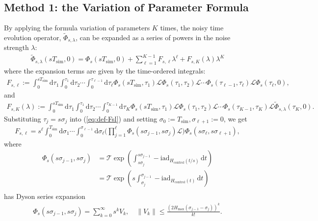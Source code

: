 \documentclass[11pt]{article}
\newcommand{\eq}[1]{(\ref{eq:#1})}
\renewcommand{\i}{\mathrm{i}}
\renewcommand{\d}{\mathrm{d}}
\renewcommand{\L}{\mathcal{L}}
\newcommand{\ad}{\mathrm{ad}}
\newcommand{\T}{\mathcal{T}}
\newcommand{\B}{\Big}
\newcommand{\simu}{\mathrm{sim}}
\newcommand{\Hc}{H_{\mathrm{control}}}
\begin{document}
\subsection{Method 1: the Variation of Parameter Formula}
By applying the formula variation of parameters $K$ times, the noisy time evolution operator, $\tilde{\Phi}_{s,\lambda}$, can be expanded as a series of powers in the noise strength $\lambda$:
\begin{align}
\label{eq:expansion-s-l}
    \tilde{\Phi}_{s,\lambda}(s T_{\simu}, 0) = \Phi_s(s T_{\simu}, 0) + \sum_{\ell=1}^{K-1}F_{s,\ell}\lambda^{\ell} + F_{s,K}(\lambda)\lambda^K 
\end{align}
where the expansion terms are given by the time-ordered integrals:
\begin{align}
    \label{eq:def-Fsl}
    F_{s,\ell} := \int_{0}^{s T_{\simu}} \d \tau_1 \int_{0}^{\tau_1}\d \tau_2 \cdots \int_{0}^{\tau_{\ell-1}} \d \tau_{\ell} \Phi_s(s T_{\simu}, \tau_1) \L \Phi_s(\tau_1, \tau_2) \L \cdots \Phi_s(\tau_{\ell-1}, \tau_{\ell}) \L\Phi_s(\tau_{\ell},0),
\end{align}
and
\begin{align*}
    F_{s, K}(\lambda) := \int_{0}^{s T_{\simu}} \d \tau_1 \int_{0}^{\tau_1}\d \tau_2 \cdots \int_{0}^{\tau_{K-1}} \d \tau_{K} \Phi_s(s T_{\simu}, \tau_1) \L \Phi_s(\tau_1, \tau_2) \L \cdots \Phi_s(\tau_{K-1}, \tau_{K}) \L\tilde{\Phi}_{s,\lambda}(\tau_{K},0).
\end{align*}
Substituting $\tau_j=s\sigma_j$ into \eq{def-Fsl} and setting $\sigma_{0}:=T_{\simu}, \sigma_{\ell+1}:=0$, we get \begin{align}
\label{eq:Fsl}
    F_{s,\ell}=s^\ell \int_{0}^{T_{\simu}} \d\sigma_1 \cdots \int_{0}^{\sigma_{\ell-1}} \d\sigma_{\ell} \B( \prod_{j=1}^{\ell} \Phi_s(s\sigma_{j-1}, s\sigma_j) \L \B) \Phi_s(s\sigma_\ell, s\sigma_{\ell+1}) ,
\end{align}
where \begin{align*}
    \Phi_s(s\sigma_{j-1}, s\sigma_j) &=\T \exp(\int_{s\sigma_j}^{s\sigma_{j-1}} -\i\ad_{\Hc(t/s)}\,\d t) \\
    &= \T \exp(s\int_{\sigma_j}^{\sigma_{j-1}} -\i\ad_{\Hc(t)}\,\d t) \\
\end{align*}
has Dyson series expansion \begin{align}
\label{eq:dyson-Phi}
    \Phi_s(s\sigma_{j-1}, s\sigma_j)=\sum_{k=0}^{\infty} s^k V_k,\quad  \|V_k\| \leq \frac{(2 H_{\max }(\sigma_{j-1}-\sigma_j))^k}{k!}.
\end{align}
\end{document}
